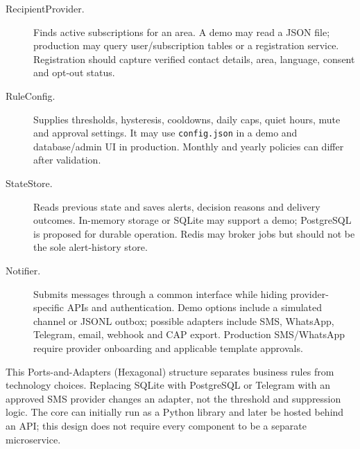 \documentclass[10pt,openany]{report}
\begin{document}
\begin{description}
\item[RecipientProvider.] Finds active subscriptions for an area. A demo may read a JSON file; production may query user/subscription tables or a registration service. Registration should capture verified contact details, area, language, consent and opt-out status.
\item[RuleConfig.] Supplies thresholds, hysteresis, cooldowns, daily caps, quiet hours, mute and approval settings. It may use \texttt{config.json} in a demo and database/admin UI in production. Monthly and yearly policies can differ after validation.
\item[StateStore.] Reads previous state and saves alerts, decision reasons and delivery outcomes. In-memory storage or SQLite may support a demo; PostgreSQL is proposed for durable operation. Redis may broker jobs but should not be the sole alert-history store.
\item[Notifier.] Submits messages through a common interface while hiding provider-specific APIs and authentication. Demo options include a simulated channel or JSONL outbox; possible adapters include SMS, WhatsApp, Telegram, email, webhook and CAP export. Production SMS/WhatsApp require provider onboarding and applicable template approvals.
\end{description}

This Ports-and-Adapters (Hexagonal) structure separates business rules from technology choices. Replacing SQLite with PostgreSQL or Telegram with an approved SMS provider changes an adapter, not the threshold and suppression logic. The core can initially run as a Python library and later be hosted behind an API; this design does not require every component to be a separate microservice.
\end{document}
